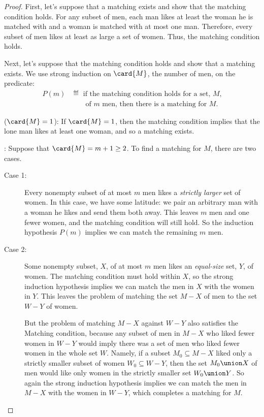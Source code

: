 \begin{proof}
  First, let's suppose that a matching exists and show that the matching
  condition holds.  For any subset of men, each man likes at least the
  woman he is matched with and a woman is matched with at most one man.
  Therefore, every subset of men likes at least as large a set of women.
  Thus, the matching condition holds.

Next, let's suppose that the matching condition holds and show that a
matching exists.  We use strong induction on $\card{M}$, the number of
men, on the predicate:
\begin{align*}
    P(m) & \eqdef \text{ if the matching condition holds for a set,~$M$,}\\
         &\qquad  \text{of~$m$ men, then there is a matching for~$M$.}
\end{align*}

 ($\card{M}=1$): If $\card{M} = 1$, then the
matching condition implies that the lone man likes at least one woman,
and so a matching exists.

: \iffalse
We need to show that $\forall k \le m.\, P(k) \QIMPLIES
P(m + 1)$.\fi  Suppose that $\card{M} = m + 1 \ge 2$.  To find a
matching for $M$, there are two cases.
\begin{description}

\item[Case 1:] Every nonempty subset of at most $m$ men likes a
  \emph{strictly larger} set of women.  In this case, we have some
  latitude: we pair an arbitrary man with a woman he likes and send
  them both away.  This leaves $m$ men and one fewer women, and the
  matching condition will still hold.  So the induction hypothesis
  $P(m)$ implies we can match the remaining $m$ men.

\item[Case 2:] Some nonempty subset, $X$, of at most $m$ men likes an
  \emph{equal-size} set, $Y$, of women.  The matching condition must
  hold within $X$, so the strong induction hypothesis implies we can
  match the men in $X$ with the women in $Y$.  This leaves the problem
  of matching the set $M-X$ of men to the set $W-Y$ of women.

  But the problem of matching $M-X$ against $W-Y$ also satisfies the
  Matching condition, because any subset of men in $M-X$ who liked
  fewer women in $W-Y$ would imply there was a set of men who liked
  fewer women in the whole set $W$.  Namely, if a subset
  $M_0 \subseteq M-X$ liked only a strictly smaller subset of women
  $W_0 \subseteq W-Y$, then the set $M_0 \union X$ of men would like
  only women in the strictly smaller set $W_0 \union Y$.  So again the
  strong induction hypothesis implies we can match the men in $M-X$
  with the women in $W-Y$, which completes a matching for $M$.
  

\end{description}
\end{proof}
